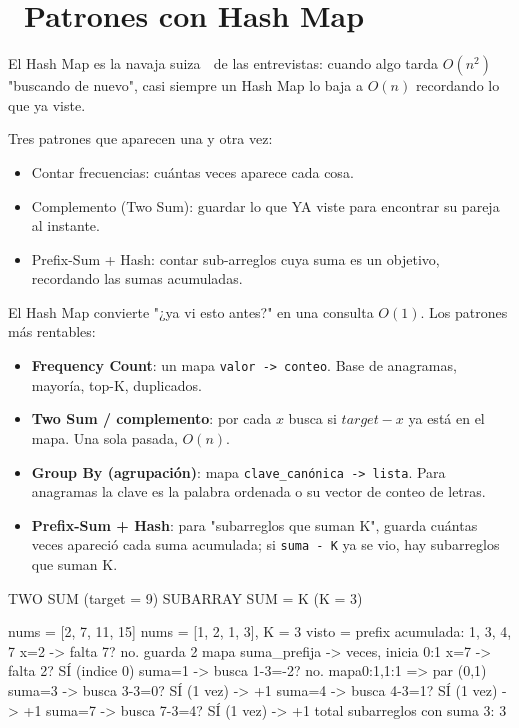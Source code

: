 \chapter[\emj{🗝️}~Patrones con Hash Map (Frecuencias, Prefix-Sum, Agrupación)]{~Patrones con Hash Map}

\begin{dsaquees}

El Hash Map es la navaja suiza 🔪 de las entrevistas: cuando algo tarda
$O(n^2)$ "buscando de nuevo", casi siempre un Hash Map lo baja a $O(n)$
recordando lo que ya viste.

Tres patrones que aparecen una y otra vez:
\begin{itemize}
\item Contar frecuencias: cuántas veces aparece cada cosa.
\item Complemento (Two Sum): guardar lo que YA viste para encontrar su
      pareja al instante.
\item Prefix-Sum + Hash: contar sub-arreglos cuya suma es un objetivo,
      recordando las sumas acumuladas.
\end{itemize}

\end{dsaquees}

\begin{dsaotraforma}

El Hash Map convierte "¿ya vi esto antes?" en una consulta $O(1)$. Los
patrones más rentables:

\begin{itemize}
\item \textbf{Frequency Count}: un mapa \verb|valor -> conteo|. Base de
      anagramas, mayoría, top-K, duplicados.
\item \textbf{Two Sum / complemento}: por cada $x$ busca si $target-x$ ya
      está en el mapa. Una sola pasada, $O(n)$.
\item \textbf{Group By (agrupación)}: mapa \verb|clave_canónica -> lista|.
      Para anagramas la clave es la palabra ordenada o su vector de
      conteo de letras.
\item \textbf{Prefix-Sum + Hash}: para "subarreglos que suman K", guarda
      cuántas veces apareció cada suma acumulada; si \verb|suma - K| ya
      se vio, hay subarreglos que suman K.
\end{itemize}

\end{dsaotraforma}

\begin{dsadiagrama}
TWO SUM (target = 9)          SUBARRAY SUM = K (K = 3)

nums = [2, 7, 11, 15]         nums = [1, 2, 1, 3], K = 3
visto = {}                    prefix acumulada: 1, 3, 4, 7
x=2 -> falta 7? no. guarda 2  mapa {suma_prefija -> veces}, inicia {0:1}
x=7 -> falta 2? SÍ (indice 0) suma=1 -> busca 1-3=-2? no. mapa{0:1,1:1}
       => par (0,1)           suma=3 -> busca 3-3=0? SÍ (1 vez) -> +1
                              suma=4 -> busca 4-3=1? SÍ (1 vez) -> +1
                              suma=7 -> busca 7-3=4? SÍ (1 vez) -> +1
                              total subarreglos con suma 3: 3
\end{dsadiagrama}

